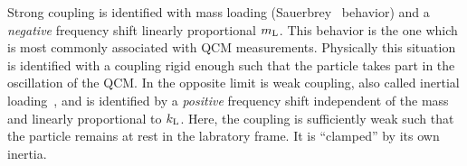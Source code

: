 Strong coupling is identified with mass loading
(Sauerbrey~\cite{sauerbrey1959verwendung} behavior) and a \textit{negative}
frequency shift linearly proportional $m_\mathrm{L}$.  This behavior is the one
which is most commonly associated with QCM measurements.  Physically this
situation is identified with a coupling rigid enough such that the particle
takes part in the oscillation of the QCM.  In the opposite limit is weak
coupling, also called inertial loading~\cite{dybwad1985sensitive}, and is
identified by a \textit{positive} frequency shift independent of the mass
and linearly proportional to $k_\mathrm{L}$.  Here, the coupling is sufficiently
weak such that the particle remains at rest in the labratory frame.  It is
``clamped'' by its own inertia.~\cite{du2008role}


